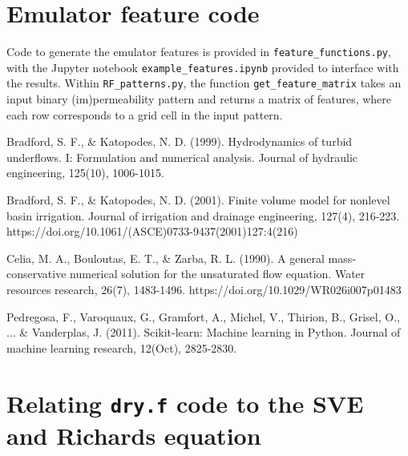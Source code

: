 \documentclass{article}
\newcommand{\code}[1]{\texttt{#1}}
\begin{document}


\section{Emulator feature code}
\label{emulator}
Code to generate the emulator features is provided in \code{feature\_functions.py}, with the Jupyter notebook \code{example\_features.ipynb} provided to interface with the results.
Within \code{RF\_patterns.py}, the  function \code{get\_feature\_matrix} takes an input binary (im)permeability pattern and returns a matrix of features, where each row corresponds to a grid cell in the input pattern.


 \begin{thebibliography}{}
  Bradford, S. F., \& Katopodes, N. D. (1999). Hydrodynamics of turbid underflows. I: Formulation and numerical analysis. Journal of hydraulic engineering, 125(10), 1006-1015.

  Bradford, S. F., \& Katopodes, N. D. (2001). Finite volume model for nonlevel basin irrigation. Journal of irrigation and drainage engineering, 127(4), 216-223. https://doi.org/10.1061/(ASCE)0733-9437(2001)127:4(216)
 
  Celia, M. A., Bouloutas, E. T., \& Zarba, R. L. (1990). A general mass‐conservative numerical solution for the unsaturated flow equation. Water resources research, 26(7), 1483-1496.  https://doi.org/10.1029/WR026i007p01483

  Pedregosa, F., Varoquaux, G., Gramfort, A., Michel, V., Thirion, B., Grisel, O., ... \& Vanderplas, J. (2011). Scikit-learn: Machine learning in Python. Journal of machine learning research, 12(Oct), 2825-2830.
 \end{thebibliography}


\appendix


\renewcommand\thefigure{A\arabic{figure}} 
\renewcommand\thetable{A\arabic{table}}
\setcounter{figure}{0}
\setcounter{table}{0}


\section{Relating \code{dry.f} code to the SVE and Richards equation }
\end{document}
